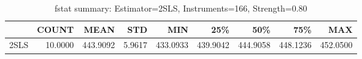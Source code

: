 \begin{table}[ht]
\centering
\caption{fstat summary: Estimator=2SLS, Instruments=166, Strength=0.80}
\begin{tabular}{lrrrrrrrr}
\toprule
 & COUNT & MEAN & STD & MIN & 25\% & 50\% & 75\% & MAX \\
\midrule
2SLS & 10.0000 & 443.9092 & 5.9617 & 433.0933 & 439.9042 & 444.9058 & 448.1236 & 452.0500 \\
\bottomrule
\end{tabular}
\end{table}
